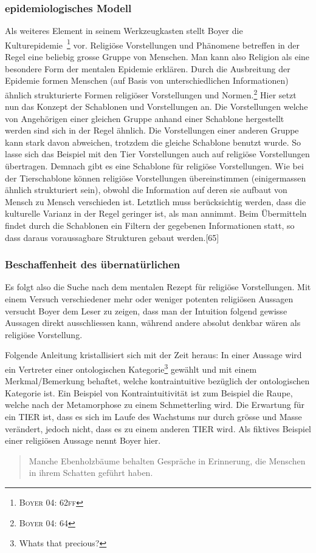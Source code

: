 \subsubsection*{epidemiologisches Modell}
Als weiteres Element in seinem Werkzeugkasten stellt Boyer die Kulturepidemie~\footnote{\textsc{Boyer 04: 62ff}} vor. Religiöse Vorstellungen und Phänomene betreffen in der Regel eine beliebig grosse Gruppe von Menschen.
Man kann also Religion als eine besondere Form der mentalen Epidemie erklären. Durch die Ausbreitung der Epidemie formen Menschen (auf Basis von unterschiedlichen Informationen) ähnlich strukturierte Formen religiöser Vorstellungen und Normen.\footnote{\textsc{Boyer 04: 64}} Hier setzt nun das Konzept der Schablonen und Vorstellungen an. Die Vorstellungen welche von Angehörigen einer gleichen Gruppe anhand einer Schablone hergestellt werden sind sich in der Regel ähnlich. Die Vorstellungen einer anderen Gruppe kann stark davon abweichen, trotzdem die gleiche Schablone benutzt wurde. So lasse sich das Beispiel mit den Tier Vorstellungen auch auf religiöse Vorstellungen übertragen. Demnach gibt es eine Schablone für religiöse Vorstellungen. Wie bei der Tierschablone können religiöse Vorstellungen übereinstimmen (einigermassen ähnlich strukturiert sein), obwohl die Information auf deren sie aufbaut von Mensch zu Mensch verschieden ist. Letztlich muss berücksichtig werden, dass die kulturelle Varianz in der Regel geringer ist, als man annimmt. Beim Übermitteln findet durch die Schablonen ein Filtern der gegebenen Informationen statt, so dass daraus voraussagbare Strukturen gebaut werden.[65]

\subsubsection*{Beschaffenheit des übernatürlichen}
Es folgt also die Suche nach dem mentalen Rezept für religiöse Vorstellungen. Mit einem Versuch verschiedener mehr oder weniger potenten religiösen Aussagen versucht Boyer dem Leser zu zeigen, dass man der Intuition folgend gewisse Aussagen direkt ausschliessen kann, während andere absolut denkbar wären als religiöse Vorstellung. 

Folgende Anleitung kristallisiert sich mit der Zeit heraus: In einer Aussage wird ein Vertreter einer ontologischen Kategorie\footnote{Whats that precious?} gewählt und mit einem Merkmal/Bemerkung behaftet, welche kontraintuitive bezüglich der ontologischen Kategorie ist. Ein Beispiel von Kontraintuitivität ist zum Beispiel die Raupe, welche nach der Metamorphose zu einem Schmetterling wird. Die Erwartung für ein TIER ist, dass es sich im Laufe des Wachstums nur durch grösse und Masse verändert, jedoch nicht, dass es zu einem anderen TIER wird. Als fiktives Beispiel einer religiösen Aussage nennt Boyer hier. 
\begin{quote}Manche Ebenholzbäume behalten Gespräche in Erinnerung, die Menschen in ihrem Schatten geführt haben.\end{quote} 

